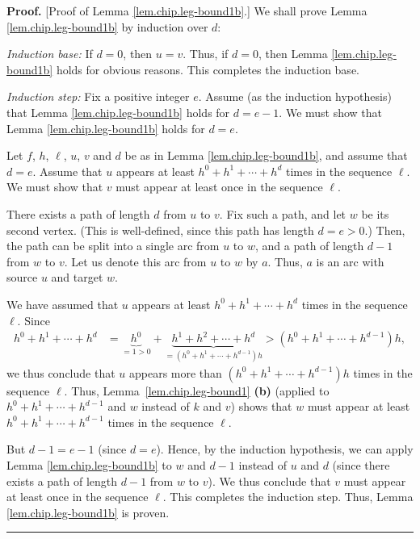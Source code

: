 \documentclass[numbers=enddot,12pt,final,onecolumn,notitlepage]{scrartcl}%
\theoremstyle{definition}
\newenvironment{proof}[1][Proof]{\noindent\textbf{#1.} }{\ \rule{0.5em}{0.5em}}
\begin{document}
\begin{proof}
[Proof of Lemma \ref{lem.chip.leg-bound1b}.] We shall prove Lemma
\ref{lem.chip.leg-bound1b} by induction over $d$:

\textit{Induction base:} If $d=0$, then $u=v$. Thus, if $d=0$, then Lemma
\ref{lem.chip.leg-bound1b} holds for obvious reasons. This completes the
induction base.

\textit{Induction step:} Fix a positive integer $e$. Assume (as the induction
hypothesis) that Lemma \ref{lem.chip.leg-bound1b} holds for $d=e-1$. We must
show that Lemma \ref{lem.chip.leg-bound1b} holds for $d=e$.

Let $f$, $h$, $\ell$, $u$, $v$ and $d$ be as in Lemma
\ref{lem.chip.leg-bound1b}, and assume that $d=e$. Assume that $u$ appears at
least $h^{0}+h^{1}+\cdots+h^{d}$ times in the sequence $\ell$. We must show
that $v$ must appear at least once in the sequence $\ell$.

There exists a path of length $d$ from $u$ to $v$. Fix such a path, and let
$w$ be its second vertex. (This is well-defined, since this path has length
$d=e>0$.) Then, the path can be split into a single arc from $u$ to $w$, and a
path of length $d-1$ from $w$ to $v$. Let us denote this arc from $u$ to $w$
by $a$. Thus, $a$ is an arc with source $u$ and target $w$.

We have assumed that $u$ appears at least $h^{0}+h^{1}+\cdots+h^{d}$ times in
the sequence $\ell$. Since%
\begin{align*}
h^{0}+h^{1}+\cdots+h^{d}  & =\underbrace{h^{0}}_{=1>0}+\underbrace{h^{1}%
+h^{2}+\cdots+h^{d}}_{=\left(  h^{0}+h^{1}+\cdots+h^{d-1}\right)  h}
>\left(  h^{0}+h^{1}+\cdots+h^{d-1}\right)  h,
\end{align*}
we thus conclude that $u$ appears more than $\left(  h^{0}+h^{1}%
+\cdots+h^{d-1}\right)  h$ times in the sequence $\ell$. Thus,
Lemma~\ref{lem.chip.leg-bound1} \textbf{(b)} (applied to $h^{0}+h^{1}%
+\cdots+h^{d-1}$ and $w$ instead of $k$ and $v$) shows that $w$ must appear at
least $h^{0}+h^{1}+\cdots+h^{d-1}$ times in the sequence $\ell$.

But $d-1=e-1$ (since $d=e$). Hence, by the induction hypothesis, we can apply
Lemma \ref{lem.chip.leg-bound1b} to $w$ and $d-1$ instead of $u$ and $d$
(since there exists a path of length $d-1$ from $w$ to $v$). We thus conclude
that $v$ must appear at least once in the sequence $\ell$. This completes the
induction step. Thus, Lemma \ref{lem.chip.leg-bound1b} is proven.
\end{proof}
\end{document}
